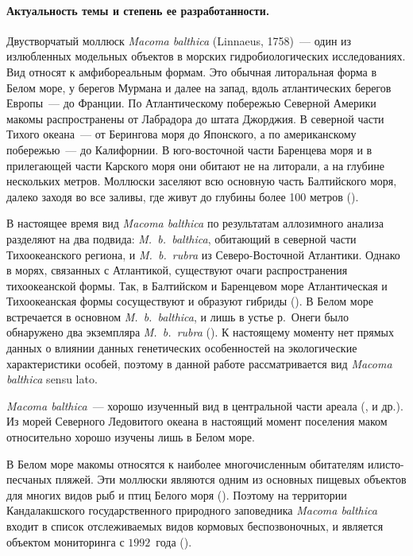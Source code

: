 \paragraph {Актуальность темы и степень ее разработанности.}
Двустворчатый моллюск {\it Macoma balthica} (Linnaeus, 1758)~--- один из излюбленных модельных объектов в морских гидробиологических исследованиях. 
Вид относят к амфибореальным формам. 
Это обычная литоральная форма в Белом море, у берегов Мурмана и далее на запад, вдоль атлантических берегов Европы~--- до Франции. 
По Атлантическому побережью Северной Америки макомы распространены от Лабрадора до штата Джорджия. 
В северной части Тихого океана~--- от Берингова моря до Японского, а по американскому побережью~--- до Калифорнии. 
В юго-восточной части Баренцева моря и в прилегающей части Карского моря они обитают  не на литорали, а на глубине нескольких метров. 
Моллюски заселяют всю основную часть Балтийского моря, далеко заходя во все заливы, где живут до глубины более 100 метров (\cite{Zacepin_Filatova_1968}).

В настоящее время вид {\it Macoma balthica} по результатам аллозимного анализа разделяют на два подвида: {\it M.~b.~balthica}, обитающий в северной части Тихоокеанского региона, и {\it M.~b.~rubra} из Северо-Восточной Атлантики. 
Однако  в морях, связанных с  Атлантикой, существуют очаги распространения тихоокеанской формы. 
Так, в Балтийском и Баренцевом море Атлантическая и Тихоокеанская формы сосуществуют и образуют гибриды (\cite{Vainola_2003}). 
В Белом море встречается в основном {\it M.~b.~balthica}, и лишь в устье р.~Онеги было обнаружено два экземпляра {\it M.~b.~rubra} (\cite{Nikula_et_al_2007}).
К настоящему моменту нет прямых данных о влиянии данных генетических особенностей на экологические характеристики особей, поэтому в данной работе рассматривается вид {\it Macoma balthica} sensu lato.


{\it Macoma balthica}~--- хорошо изученный вид в центральной части ареала (\cite{Segerstrale_1960, Lavoie_1970, Gilbert_1978, Vincent_et_al_1989, Hiddink_et_al_2002_predation_epifauna, Hiddink_et_al_2002_predation_infauna, Beukema_et_al_2009}, и др.). 
Из морей Северного Ледовитого океана в настоящий момент поселения маком относительно хорошо изучены лишь в Белом море.


В Белом море макомы относятся к наиболее многочисленным обитателям илисто-песчаных пляжей. 
Эти моллюски являются одним из основных пищевых объектов для многих видов рыб и птиц Белого моря (\cite{Azarov_1963, Percov_1963, Golcev_et_al_1997, Bianki_et_al_2003}). 
Поэтому на территории Кандалакшского государственного природного заповедника {\it Macoma balthica} входит в список отслеживаемых видов кормовых беспозвоночных, и является объектом мониторинга с $1992$~года (\cite{Nazarova_2003}).

